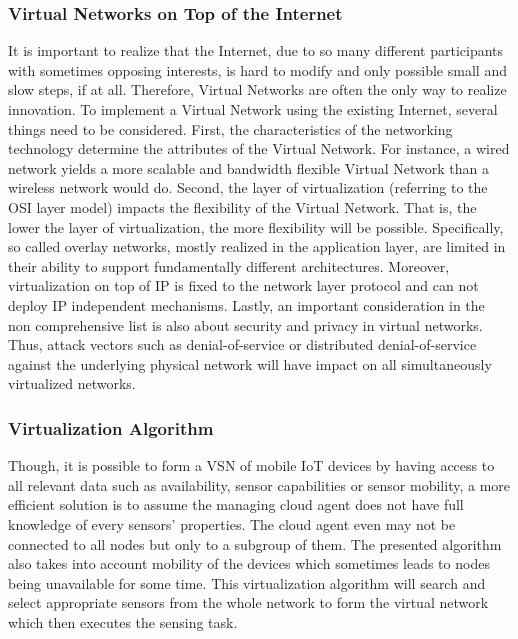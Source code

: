 \documentclass[12pt,journal]{IEEEtran}
\begin{document}
\subsubsection{Virtual Networks on Top of the Internet}
It is important to realize that the Internet, due to so many different participants with sometimes opposing interests, is hard to modify and only possible small and slow steps, if at all. Therefore, Virtual Networks are often the only way to realize innovation. To implement a Virtual Network using the existing Internet, several things need to be considered. First, the characteristics of the networking technology determine the attributes of the Virtual Network. For instance, a wired network yields a more scalable and bandwidth flexible Virtual Network than a wireless network would do. \cite{Chowdhury} Second, the layer of virtualization (referring to the OSI layer model) impacts the flexibility of the Virtual Network. That is, the lower the layer of virtualization, the more flexibility will be possible. Specifically, so called overlay networks, mostly realized in the application layer, are limited in their ability to support fundamentally different architectures. \cite{Chowdhury} Moreover, virtualization on top of IP is fixed to the network layer protocol and can not deploy IP independent mechanisms.  \cite{Chowdhury} Lastly, an important consideration in the non comprehensive list is also about security and privacy in virtual networks. Thus, attack vectors such as denial-of-service or distributed denial-of-service against the underlying physical network will have impact on all simultaneously virtualized networks.
\subsubsection{Virtualization Algorithm}
Though, it is possible to form a VSN of mobile IoT devices by having access to all relevant data such as availability, sensor capabilities or sensor mobility, a more efficient solution is to assume the managing cloud agent does not have full knowledge of every sensors’ properties. \cite{Sherif} The cloud agent even may not be connected to all nodes but only to a subgroup of them. The presented algorithm also takes into account mobility of the devices which sometimes leads to nodes being unavailable for some time. \cite{Sherif}
This virtualization algorithm will search and select appropriate sensors from the whole network to form the virtual network which then executes the sensing task.
\end{document}
